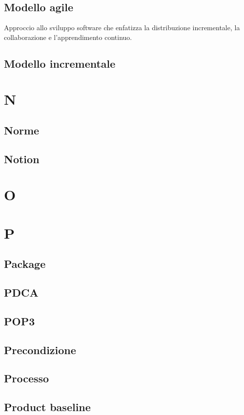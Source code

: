 \documentclass[12pt]{article}
\begin{document}
		\subsection{Modello agile}
		Approccio allo sviluppo software che enfatizza la distribuzione incrementale, la collaborazione e l'apprendimento continuo.

		\subsection{Modello incrementale}

	\clearpage
	\section{N}
		\subsection{Norme}
		\subsection{Notion}
	\clearpage
	\section{O}
	\clearpage
	\section{P}
		\subsection{Package}
		\subsection{PDCA} %
		\subsection{POP3}
		\subsection{Precondizione}
		\subsection{Processo}
		\subsection{Product baseline}
\end{document}
